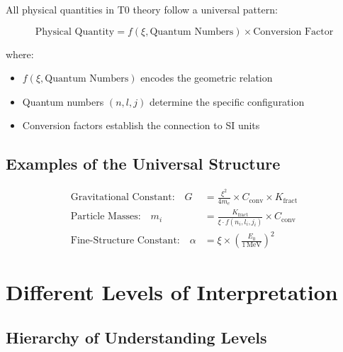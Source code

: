 \documentclass[12pt,a4paper]{article}
\begin{document}
	All physical quantities in T0 theory follow a universal pattern:
	
	\begin{equation}
		\boxed{\text{Physical Quantity} = f(\xi, \text{Quantum Numbers}) \times \text{Conversion Factor}}
		\label{eq:universal_pattern}
	\end{equation}
	
	where:
	\begin{itemize}
		\item $f(\xi, \text{Quantum Numbers})$ encodes the geometric relation
		\item Quantum numbers $(n,l,j)$ determine the specific configuration
		\item Conversion factors establish the connection to SI units
	\end{itemize}
	
	\subsection{Examples of the Universal Structure}
	
	\begin{align}
		\text{Gravitational Constant:} \quad G &= \frac{\xi^2}{4m_e} \times C_{\text{conv}} \times K_{\text{fract}} \\
		\text{Particle Masses:} \quad m_i &= \frac{K_{\text{fract}}}{\xi \cdot f(n_i,l_i,j_i)} \times C_{\text{conv}} \\
		\text{Fine-Structure Constant:} \quad \alpha &= \xi \times \left(\frac{E_0}{1\,\mathrm{MeV}}\right)^2
	\end{align}
	
	\section{Different Levels of Interpretation}
	
	\subsection{Hierarchy of Understanding Levels}
	
\end{document}
